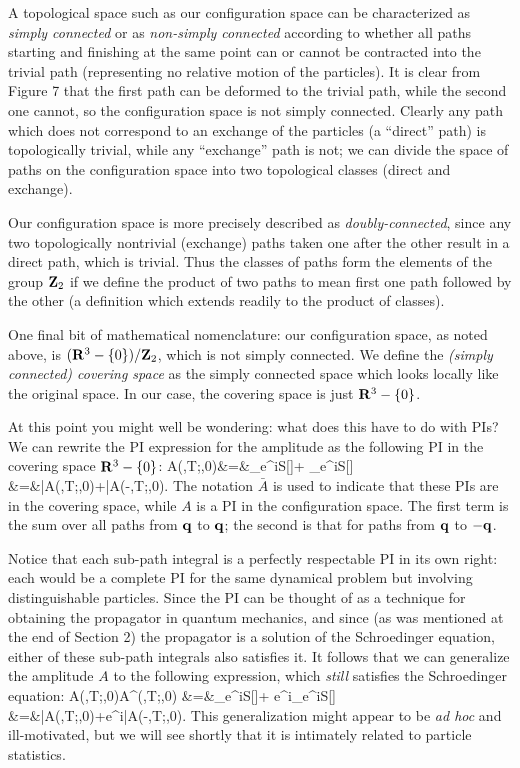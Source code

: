 \documentclass[12pt]{article}
\begin{document}
A topological space such as our configuration
space can be characterized as {\em simply connected} or
as {\em non-simply connected} according to whether all paths starting
and finishing at the same point can or cannot be contracted into the
trivial path (representing no relative motion of the particles). It is
clear from Figure 7 that the first path can be deformed to the
trivial path, while the second one cannot, so the configuration space
is not simply connected. Clearly any path which does not correspond to
an exchange of the particles (a ``direct'' path) is topologically
trivial, while any ``exchange'' path is not; we can divide the space
of paths on the configuration space into two topological classes (direct
and exchange). 

Our configuration space is more precisely described as
{\em doubly-connected}, since any two topologically nontrivial (exchange)
paths taken one after the other result in a direct path, which is
trivial. Thus the classes of paths form the elements of the
group ${\mathbf Z}_2$ if we
define the product of two paths to mean first one path followed by the
other (a definition which extends readily to the product of classes).

One final bit of mathematical nomenclature: our configuration space,
as noted above, is $({\mathbf R}^3-\{0\})/{\mathbf Z}_2$, which is not simply
connected. We define the {\em (simply connected) covering space} as
the simply connected space which looks locally like the original
space. In our case, the covering space is just ${\mathbf R}^3-\{0\}$.

At this point you might well be wondering:
what does this have to do with PIs? We can rewrite the PI expression
for the amplitude as the following PI in the covering space
${\mathbf R}^3-\{0\}$:
\bea 
A(\bfq,T;\bfq,0)&=&\sum_{}e^{iS[\bfq]}+
\sum_{}e^{iS[\bfq]}\nonumber\\
&=&\bar A(\bfq,T;\bfq,0)+\bar A(-\bfq,T;\bfq,0).
\label{stat1}
\eea
The notation $\bar A$ is used to indicate that these PIs are
in the covering space, while $A$ is a PI in the
configuration space. The first term is the sum over all paths from
${\mathbf q}$ to ${\mathbf q}$; the second is that for paths from ${\mathbf q}$ to $-{\mathbf q}$.

Notice that each sub-path integral is a perfectly respectable PI in
its own right: each would be a complete PI for the same
dynamical problem but involving
distinguishable particles. Since the PI can
be thought of as a technique for obtaining the propagator in quantum
mechanics, and since (as was mentioned at the end of Section 2) the
propagator is a solution of the Schroedinger equation, either of these 
sub-path integrals also satisfies it. It follows that we can
generalize the amplitude $A$ to the following expression, which {\em
  still} satisfies the Schroedinger equation:
\bea
A(\bfq,T;\bfq,0)\to A^\phi(\bfq,T;\bfq,0)
&=&\sum_{}e^{iS[\bfq]}+
e^{i\phi}\sum_{}e^{iS[\bfq]}\nonumber\\
&=&\bar A(\bfq,T;\bfq,0)+e^{i\phi}\bar A(-\bfq,T;\bfq,0).
\label{stat2}
\eea
This generalization might appear to be {\it ad hoc} and ill-motivated,
but we will see shortly that it is intimately related to particle
statistics.
\end{document}
